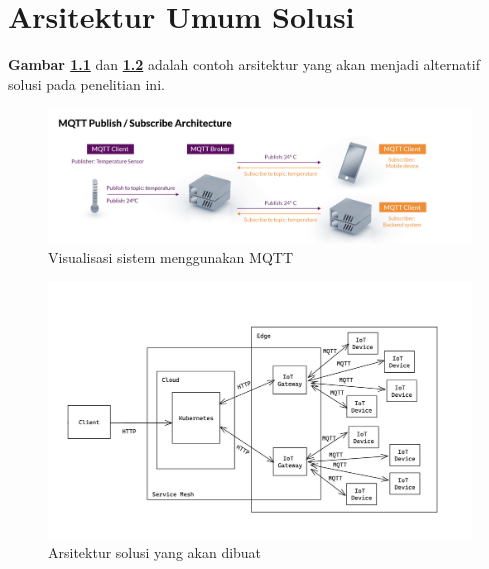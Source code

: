 \chapter{Arsitektur Umum Solusi}
\label{appendix:gambaran-umum-solusi}
\textbf{Gambar \ref{fig:mqtt-architecture-image}} dan \textbf{\ref{fig:appendix-gambaran-umum-solusi}} adalah contoh arsitektur yang akan menjadi alternatif solusi pada penelitian ini.

\begin{figure}[ht]
  \centering
  \includegraphics[width=1\textwidth]{resources/appendix/arsitektur-mqtt.jpg}
  \caption{Visualisasi sistem menggunakan MQTT \parencite{mqtt}}
  \label{fig:mqtt-architecture-image}
\end{figure}

\begin{figure}[ht]
  \centering
  \includegraphics[width=1\textwidth]{resources/appendix/gambaran-umum-solusi.jpg}
  \caption{Arsitektur solusi yang akan dibuat}
  \label{fig:appendix-gambaran-umum-solusi}
\end{figure}